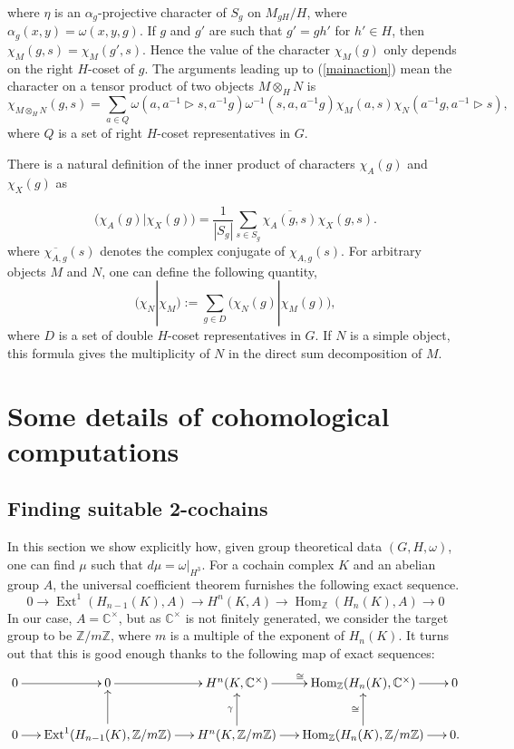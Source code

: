\documentclass[11pt]{book}
\theoremstyle{Rem}
\theoremstyle{definition}
\numberwithin{equation}{section}
\newcommand\hit{\triangleright}
\newcommand\inv{^{-1}}
\newcommand\Hom{\operatorname{Hom}}
\newcommand\Ext{\operatorname{Ext}}
\newcommand\CC{\mathbb C}
\newcommand\ZZ{\mathbb Z}
\begin{document}
 where $\eta$ is an $\alpha_g$-projective character of $S_g$ on $M_{gH}/H$, where $\alpha_g(x,y) = \omega(x,y,g)$.  If $g$ and $g'$ are such that $g'= gh'$ for $ h'\in H$, then $\chi_{M}(g,s) = \chi_{M}(g',s)$. Hence the value of the character $\chi_{M}(g)$ only depends on the right $H$-coset of $g$.  The arguments leading up to (\ref{mainaction}) mean the character on a tensor product of two objects $M\otimes_H N$ is \begin{equation}\label{tensorchar}
	\chi_{M\otimes_H N }(g,s) = \sum_{a\in Q} \omega(a, a\inv \hit s, a\inv g)\omega\inv(s,a, a\inv g) \chi_{M}(a,s)\chi_{N}(a\inv g, a\inv \hit s ),
\end{equation} where $Q$ is a set of right $H$-coset representatives in $G$.
 
There is a natural definition of the inner product of characters $\chi_{A}(g)$ and $ \chi_{X}(g)$ as

\begin{equation}
\big(\chi_{A}(g)| \chi_{X}(g)\big) = \frac{1}{|S_g|} \sum_{s\in S_g} \overline{\chi_{A}(g,s)}\chi_{X}(g,s).
\end{equation}
where $\overline{\chi_{A,g}}(s)$ denotes the complex conjugate of $\chi_{A,g}(s)$.
For arbitrary objects $M$ and $N$, one can define the following quantity,
\begin{equation}
	(\chi_N| \chi_M) := \sum_{g\in D} \big(\chi_{N}(g)| \chi_{M}(g)\big),\label{innerprod}
\end{equation}
where $D$ is a set of double $H$-coset representatives in $G$. If $N$ is a simple object, this formula gives the multiplicity of $N$ in the direct sum decomposition of $M$.
\section{Some details of cohomological computations}
\subsection{Finding suitable 2-cochains}
In this section we show explicitly how, given group theoretical data $(G, H, \omega)$, one can find $\mu$ such that $d\mu = \omega|_{H^3}$.
For a cochain complex $K$ and an abelian group $A$, the universal coefficient theorem furnishes the following exact sequence.
\begin{equation}
	0 \rightarrow \Ext^1(H_{n-1}(K), A) \rightarrow  H^n(K,A) \rightarrow \Hom_{\ZZ}(H_n(K), A) \rightarrow 0
\end{equation}
In our case, $A=\CC^\times$, but as $\CC^\times$ is not finitely generated, we consider the target group to be $\ZZ/m\ZZ$, where $m$ is a multiple of the exponent of $H_n(K)$. It turns out that this is good enough thanks to the following map of exact sequences:
\[
\xymatrixcolsep{0.2in}
\begin{xymatrix}
{
	0 \ar[r] & 0 \ar[r] & H^n(K,\CC^\times) \ar[r]^{\cong} & \Hom_{\ZZ}(H_n(K), \CC^\times) \ar[r] & 0\\
	0 \ar[r] & \Ext^1(H_{n-1}(K), \ZZ/m\ZZ) \ar[r]\ar[u] & H^n(K,\ZZ/m\ZZ) \ar[r]\ar[u]^\gamma & \Hom_{\ZZ}(H_n(K), \ZZ/m\ZZ) \ar[r]\ar[u]^{\cong} & 0.
}
\end{xymatrix}
\]
\end{document}
